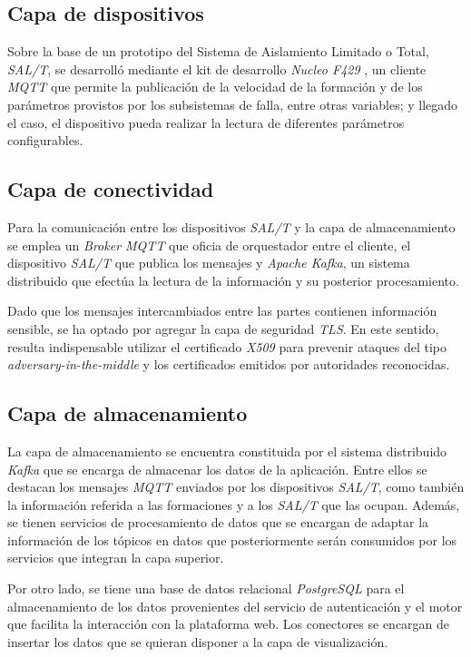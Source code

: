 \subsection{Capa de dispositivos}

Sobre la base de un prototipo del Sistema de Aislamiento Limitado o Total, \textit{SAL/T}, se desarrolló mediante el kit de desarrollo \textit{Nucleo F429} \citep{nucleo-kit}, un cliente \textit{MQTT} que permite la publicación de la velocidad de la formación y de los parámetros provistos por los subsistemas de falla, entre otras variables; y llegado el caso, el dispositivo pueda realizar la lectura de diferentes parámetros configurables.


\subsection{Capa de conectividad}

Para la comunicación entre los dispositivos \textit{SAL/T} y la capa de almacenamiento se emplea un \textit{Broker MQTT} que oficia de orquestador entre el cliente, el dispositivo \textit{SAL/T} que publica los mensajes y \textit{Apache Kafka}, un sistema distribuido que efectúa la lectura de la información y su posterior procesamiento. 

Dado que los mensajes intercambiados entre las partes contienen información sensible, se ha optado por agregar la capa de seguridad \textit{TLS}. En este sentido, resulta indispensable utilizar el certificado \textit{X509} para prevenir ataques del tipo \textit{adversary-in-the-middle} y los certificados emitidos por autoridades reconocidas.


\subsection{Capa de almacenamiento}

La capa de almacenamiento se encuentra constituida por el sistema distribuido \textit{Kafka} que se encarga de almacenar los datos de la aplicación. Entre ellos se destacan los mensajes \textit{MQTT} enviados por los dispositivos \textit{SAL/T}, como también la información referida a las formaciones y a los \textit{SAL/T} que las ocupan. Además, se tienen servicios de procesamiento de datos que se encargan de adaptar la información de los tópicos en datos que posteriormente serán consumidos por los servicios que integran la capa superior.

Por otro lado, se tiene una base de datos relacional \textit{PostgreSQL} para el almacenamiento de los datos provenientes del servicio de autenticación y el motor que facilita la interacción con la plataforma web. Los conectores se encargan de insertar los datos que se quieran disponer a la capa de visualización.

